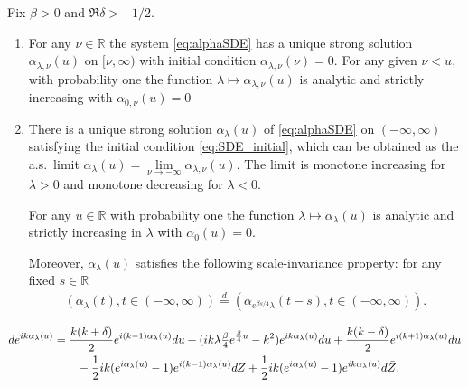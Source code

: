 \documentclass[10pt,a4paper]{amsart}
\newcommand{\R}{{\mathbb R}}
\newcommand{\ed}{\stackrel{d}{=}}
\begin{document}
\begin{proposition}\label{prop:alphaSDE}Fix $\beta>0$ and $\Re \delta>-1/2$. 


\begin{enumerate}
    \item For any $\nu\in \R$ the system \eqref{eq:alphaSDE} has a unique strong solution $\alpha_{\lambda,\nu}(u)$ on $[\nu,\infty)$ with initial condition $\alpha_{\lambda,\nu}(\nu)=0$. For any given $\nu< u$, with probability one the function $\lambda\mapsto \alpha_{\lambda,\nu}(u)$ is analytic and strictly increasing with $\alpha_{0,\nu}(u)=0$ 


    \item There is a unique strong solution $\alpha_\lambda(u)$ of \eqref{eq:alphaSDE} on $(-\infty,\infty)$ satisfying the initial condition \eqref{eq:SDE_initial}, which  can be obtained as the a.s.~limit $\alpha_\lambda(u)=\lim\limits_{\nu\to -\infty} \alpha_{\lambda,\nu}(u)$. The limit is monotone increasing for $\lambda>0$ and monotone decreasing for $\lambda<0$. 
    
    For any $u\in \R$ with probability one the function $\lambda\mapsto \alpha_\lambda(u)$ is analytic and strictly increasing in $\lambda$ with $\alpha_0(u)=0$. 

    Moreover, $\alpha_\lambda(u)$ satisfies the following scale-invariance property: for any fixed $s\in \R$ 
\begin{align}\label{eq:scale_inv}
    \left(\alpha_\lambda(t), t\in (-\infty,\infty)\right) \ed  \left(\alpha_{e^{\beta s/4}\lambda}(t-s), t\in (-\infty,\infty)\right). 
\end{align}  
\end{enumerate}
\end{proposition}

\begin{align}\notag
 d e^{i k\alpha_\lambda(u)}&=\frac{k(k+\delta)}{2} e^{i (k-1)\alpha_\lambda(u)} du+(i k \lambda \tfrac{\beta}{4}e^{\frac{\beta}{4}u}-k^2) e^{i k \alpha_\lambda(u)} du+\frac{k(k-\delta)}{2} e^{i (k+1)\alpha_\lambda(u)}du  \\
 &\qquad -\frac{1}{2} i  k (e^{i \alpha_\lambda(u)}-1) e^{i(k-1)\alpha_\lambda(u)} dZ+\frac{1}{2} i  k (e^{i \alpha_\lambda(u)}-1) e^{i k \alpha_\lambda(u)} d\bar Z. \label{eq:QkSDE}
\end{align}
\end{document}

